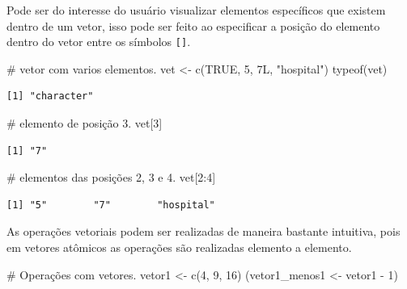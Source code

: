 \documentclass[
  letterpaper,
  DIV=11,
  numbers=noendperiod]{scrreprt}
\newenvironment{Shaded}{\begin{snugshade}}{\end{snugshade}}
\newcommand{\CommentTok}[1]{\textcolor[rgb]{0.37,0.37,0.37}{#1}}
\newcommand{\ConstantTok}[1]{\textcolor[rgb]{0.56,0.35,0.01}{#1}}
\newcommand{\DecValTok}[1]{\textcolor[rgb]{0.68,0.00,0.00}{#1}}
\newcommand{\FunctionTok}[1]{\textcolor[rgb]{0.28,0.35,0.67}{#1}}
\newcommand{\NormalTok}[1]{\textcolor[rgb]{0.00,0.23,0.31}{#1}}
\newcommand{\OtherTok}[1]{\textcolor[rgb]{0.00,0.23,0.31}{#1}}
\newcommand{\SpecialCharTok}[1]{\textcolor[rgb]{0.37,0.37,0.37}{#1}}
\newcommand{\StringTok}[1]{\textcolor[rgb]{0.13,0.47,0.30}{#1}}
\begin{document}
Pode ser do interesse do usuário visualizar elementos específicos que
existem dentro de um vetor, isso pode ser feito ao especificar a posição
do elemento dentro do vetor entre os símbolos \texttt{{[}{]}}.

\begin{Shaded}
\begin{Highlighting}[]
\CommentTok{\# vetor com varios elementos.}
\NormalTok{vet }\OtherTok{\textless{}{-}} \FunctionTok{c}\NormalTok{(}\ConstantTok{TRUE}\NormalTok{, }\DecValTok{5}\NormalTok{, 7L, }\StringTok{"hospital"}\NormalTok{)}
\FunctionTok{typeof}\NormalTok{(vet)}
\end{Highlighting}
\end{Shaded}

\begin{verbatim}
[1] "character"
\end{verbatim}

\begin{Shaded}
\begin{Highlighting}[]
\CommentTok{\# elemento de posição 3.}
\NormalTok{vet[}\DecValTok{3}\NormalTok{]}
\end{Highlighting}
\end{Shaded}

\begin{verbatim}
[1] "7"
\end{verbatim}

\begin{Shaded}
\begin{Highlighting}[]
\CommentTok{\# elementos das posições 2, 3 e 4.}
\NormalTok{vet[}\DecValTok{2}\SpecialCharTok{:}\DecValTok{4}\NormalTok{]}
\end{Highlighting}
\end{Shaded}

\begin{verbatim}
[1] "5"        "7"        "hospital"
\end{verbatim}

As operações vetoriais podem ser realizadas de maneira bastante
intuitiva, pois em vetores atômicos as operações são realizadas elemento
a elemento.

\begin{Shaded}
\begin{Highlighting}[]
\CommentTok{\# Operações com vetores.}
\NormalTok{vetor1 }\OtherTok{\textless{}{-}} \FunctionTok{c}\NormalTok{(}\DecValTok{4}\NormalTok{, }\DecValTok{9}\NormalTok{, }\DecValTok{16}\NormalTok{)}
\NormalTok{(vetor1\_menos1 }\OtherTok{\textless{}{-}}\NormalTok{ vetor1 }\SpecialCharTok{{-}} \DecValTok{1}\NormalTok{)}
\end{Highlighting}
\end{Shaded}
\end{document}

